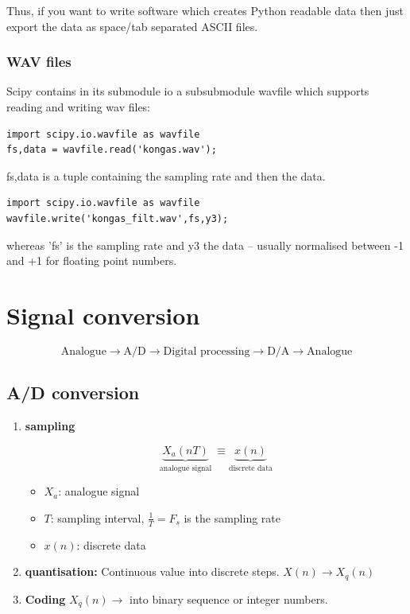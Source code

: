 \documentclass[12pt,a4paper]{article}
\begin{document}
Thus, if you want to write software which creates Python
readable data then just export the data as space/tab separated ASCII files.



\subsubsection{WAV files}
Scipy contains in its submodule io a subsubmodule wavfile which supports
reading and writing wav files:
\begin{verbatim}
import scipy.io.wavfile as wavfile
fs,data = wavfile.read('kongas.wav');
\end{verbatim}
fs,data is a tuple containing the sampling rate and then the data.

\begin{verbatim}
import scipy.io.wavfile as wavfile
wavfile.write('kongas_filt.wav',fs,y3);
\end{verbatim}
whereas 'fs' is the sampling rate and y3 the data -- usually normalised between
-1 and +1 for floating point numbers.


\clearpage


\section{Signal conversion}

\begin{equation}
\mbox{Analogue} \rightarrow \mbox{A/D} \rightarrow \mbox{Digital processing}
\rightarrow \mbox{D/A} \rightarrow \mbox{Analogue}
\end{equation}

\subsection{A/D conversion}

\begin{enumerate}

\item {\bf sampling}

\begin{equation}
\underbrace{X_{a}(nT)}_{\mbox{analogue signal}}~ \equiv \underbrace{x(n)}_{\mbox{discrete data}}
\end{equation}

\begin{itemize}
\item $X_a$: analogue signal
\item $T$: sampling interval, $\frac{1}{T}=F_s$ is the sampling rate
\item $x(n)$: discrete data
\end{itemize}

\item {\bf quantisation:} 
Continuous value into discrete steps. $X(n) \rightarrow X_{q}(n)$

\item {\bf Coding}
$X_{q}(n) \rightarrow$  into binary sequence or integer numbers.
\end{enumerate}
\end{document}
